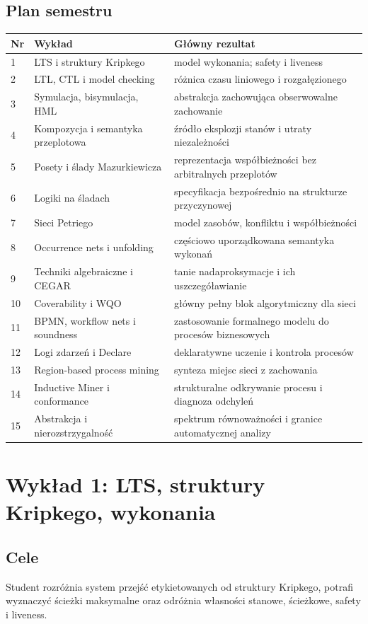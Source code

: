 \documentclass[11pt,a4paper]{article}
\begin{document}
\subsection{Plan semestru}
\begin{longtable}{@{}p{8mm}p{52mm}p{94mm}@{}}
\toprule
\textbf{Nr} & \textbf{Wykład} & \textbf{Główny rezultat}\\
\midrule
1 & LTS i struktury Kripkego & model wykonania; safety i liveness\\
2 & LTL, CTL i model checking & różnica czasu liniowego i rozgałęzionego\\
3 & Symulacja, bisymulacja, HML & abstrakcja zachowująca obserwowalne zachowanie\\
4 & Kompozycja i semantyka przeplotowa & źródło eksplozji stanów i utraty niezależności\\
5 & Posety i ślady Mazurkiewicza & reprezentacja współbieżności bez arbitralnych przeplotów\\
6 & Logiki na śladach & specyfikacja bezpośrednio na strukturze przyczynowej\\
7 & Sieci Petriego & model zasobów, konfliktu i współbieżności\\
8 & Occurrence nets i unfolding & częściowo uporządkowana semantyka wykonań\\
9 & Techniki algebraiczne i CEGAR & tanie nadaproksymacje i ich uszczegóławianie\\
10 & Coverability i WQO & główny pełny blok algorytmiczny dla sieci\\
11 & BPMN, workflow nets i soundness & zastosowanie formalnego modelu do procesów biznesowych\\
12 & Logi zdarzeń i Declare & deklaratywne uczenie i kontrola procesów\\
13 & Region-based process mining & synteza miejsc sieci z zachowania\\
14 & Inductive Miner i conformance & strukturalne odkrywanie procesu i diagnoza odchyleń\\
15 & Abstrakcja i nierozstrzygalność & spektrum równoważności i granice automatycznej analizy\\
\bottomrule
\end{longtable}

\section{Wykład 1: LTS, struktury Kripkego, wykonania}

\subsection{Cele}
Student rozróżnia system przejść etykietowanych od struktury Kripkego, potrafi wyznaczyć ścieżki maksymalne oraz odróżnia własności stanowe, ścieżkowe, safety i liveness.
\end{document}
